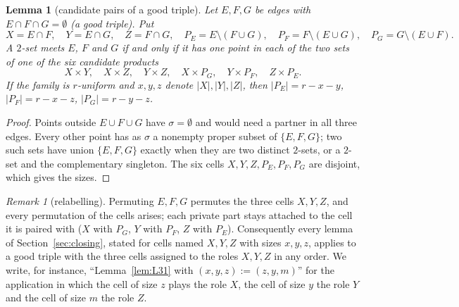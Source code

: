 \documentclass[11pt]{amsart}
\newtheorem{lemma}[theorem]{Lemma}
\theoremstyle{definition}
\theoremstyle{remark}
\newtheorem{remark}[theorem]{Remark}
\begin{document}
\begin{lemma}[candidate pairs of a good triple]\label{lem:cand3}
Let $E,F,G$ be edges with $E\cap F\cap G=\emptyset$ (a \emph{good triple}). Put
\[
X=E\cap F,\quad Y=E\cap G,\quad Z=F\cap G,\quad P_E=E\setminus(F\cup G),\quad P_F=F\setminus(E\cup G),\quad P_G=G\setminus(E\cup F).
\]
A $2$-set meets $E$, $F$ and $G$ if and only if it has one point in each of the two sets of one of the six \emph{candidate products}
\[
X\times Y,\quad X\times Z,\quad Y\times Z,\quad X\times P_G,\quad Y\times P_F,\quad Z\times P_E .
\]
If the family is $r$-uniform and $x,y,z$ denote $|X|,|Y|,|Z|$, then $|P_E|=r-x-y$, $|P_F|=r-x-z$, $|P_G|=r-y-z$.
\end{lemma}
\begin{proof}
Points outside $E\cup F\cup G$ have $\sigma=\emptyset$ and would need a partner in all three edges. Every other point has as $\sigma$ a nonempty proper subset of $\{E,F,G\}$; two such sets have union $\{E,F,G\}$ exactly when they are two distinct $2$-sets, or a $2$-set and the complementary singleton. The six cells $X,Y,Z,P_E,P_F,P_G$ are disjoint, which gives the sizes.
\end{proof}

\begin{remark}[relabelling]\label{rem:relabel}
Permuting $E,F,G$ permutes the three cells $X,Y,Z$, and every permutation of the cells arises; each private part stays attached to the cell it is paired with ($X$ with $P_G$, $Y$ with $P_F$, $Z$ with $P_E$). Consequently every lemma of Section~\ref{sec:closing}, stated for cells named $X,Y,Z$ with sizes $x,y,z$, applies to a good triple with the three cells assigned to the roles $X,Y,Z$ in any order. We write, for instance, ``Lemma~\ref{lem:L31} with $(x,y,z):=(z,y,m)$'' for the application in which the cell of size $z$ plays the role $X$, the cell of size $y$ the role $Y$ and the cell of size $m$ the role $Z$.
\end{remark}
\end{document}
